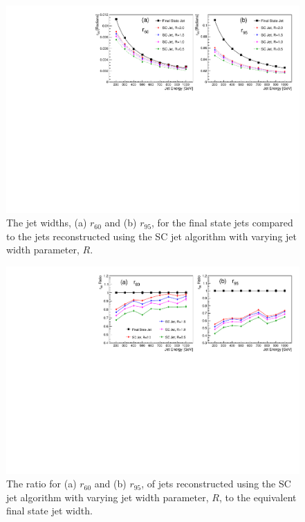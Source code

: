 \documentclass[a4paper,11pt, onecolumn]{article}
\begin{document}
  \begin{figure}[!htb]
    \begin{center}
      \includegraphics[width = \textwidth]{r_sc}
      \caption{The jet widths, (a) $r_{60}$ and (b) $r_{95}$, for the final state jets compared to the jets reconstructed using the SC jet algorithm with
              varying jet width parameter, $R$. }
      \label{r sc}
    \end{center}
    \vspace{-0.5cm}
  \end{figure}
  \begin{figure}[!htb]
    \begin{center}
      \includegraphics[width = \textwidth]{divide_sc}
      \caption{The ratio for (a) $r_{60}$ and (b) $r_{95}$, of jets reconstructed using the SC jet algorithm with
              varying jet width parameter, $R$, to the equivalent final state jet width. }
      \label{divide sc}
    \end{center}
    \vspace{-0.5cm}

  \end{figure}
  
\end{document}
